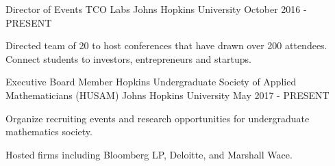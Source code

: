 


\begin{cventries}

  \cventry
    {Director of Events} %
    {TCO Labs} %
    {Johns Hopkins University} %
    {October 2016 - PRESENT} %
    {
      \begin{cvitems}
        \item {Directed team of 20 to host conferences that have drawn over 200 attendees. Connect students to investors, entrepreneurs and startups.}
      \end{cvitems}
    }
  \cventry
    {Executive Board Member} %
    {Hopkins Undergraduate Society of Applied Mathematicians (HUSAM)} %
    {Johns Hopkins University} %
    {May 2017 - PRESENT} %
    {
      \begin{cvitems} %
        \item {Organize recruiting events and research opportunities for undergraduate mathematics society.}
        \item {Hosted firms including Bloomberg LP, Deloitte, and Marshall Wace.}
      \end{cvitems}
    }

\end{cventries}